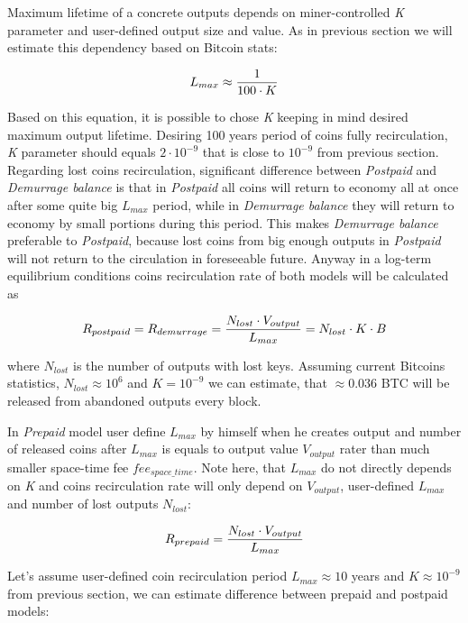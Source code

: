 \documentclass[]{article}   %
\begin{document}
Maximum lifetime of a concrete outputs depends on miner-controlled \textit{K} parameter and user-defined output size and value. As in previous section we will estimate this dependency based on Bitcoin stats:

\begin{equation}
{L_{max} \approx {1 \over 100 \cdot K}}
\end{equation}

Based on this equation, it is possible to chose \textit{K} keeping in mind desired maximum output lifetime. Desiring 100 years period of coins fully recirculation, \textit{K} parameter should equals $2 \cdot 10^{-9}$ that is close to $10^{-9}$ from previous section. Regarding lost coins recirculation, significant difference between \textit{Postpaid} and \textit{Demurrage balance} is that in \textit{Postpaid} all coins will return to economy all at once after some quite big $L_{max}$ period, while in \textit{Demurrage balance} they will return to economy by small portions during this period. This makes \textit{Demurrage balance} preferable to \textit{Postpaid}, because lost coins from big enough outputs in \textit{Postpaid} will not return to the circulation in foreseeable future. Anyway in a log-term equilibrium conditions coins recirculation rate of both models will be calculated as

\begin{equation}
R_{postpaid} = R_{demurrage} = {N_{lost} \cdot V_{output} \over L_{max}} = {N_{lost} \cdot K \cdot B}
\end{equation}

where $N_{lost}$ is the number of outputs with lost keys. Assuming current Bitcoins statistics, $N_{lost}\approx10^6$ and $K = 10^{-9}$ we can estimate, that $\approx0.036$ BTC will be released from abandoned outputs every block.

In \textit{Prepaid} model user define $L_{max}$ by himself when he creates output and number of released coins after $L_{max}$ is equals to output value $V_{output}$ rater than much smaller space-time fee $fee_{space\_time}$. Note here, that $L_{max}$ do not directly depends on \textit{K} and coins recirculation rate will only depend on $V_{output}$, user-defined $L_{max}$ and number of lost outputs $N_{lost}$:

\begin{equation}
R_{prepaid} = {N_{lost} \cdot V_{output} \over L_{max}}
\end{equation}

Let's assume user-defined coin recirculation period $L_{max}\approx10$ years and $K\approx10^{-9}$ from previous section, we can estimate difference between prepaid and postpaid models:
\end{document}
